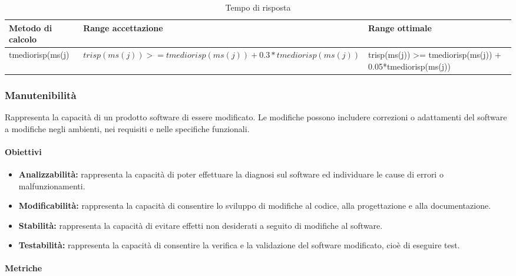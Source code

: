 			\begin{table}[H]
				\begin{longtable}{>{\centering\arraybackslash}p{5cm}|>{\centering\arraybackslash}p{5cm} | >{\centering\arraybackslash}p{5cm}}
					\hline
					\rowcolor{Gray}
					\textbf{Metodo di calcolo} & \textbf{Range accettazione} & \textbf{Range ottimale} \\
					\hline
					tmediorisp(ms(j) &\begin{math}trisp(ms(j)) >= tmediorisp(ms(j)) + 0.3*tmediorisp(ms(j)) \end{math}& trisp(ms(j)) >= tmediorisp(ms(j)) + 0.05*tmediorisp(ms(j))
				\end{longtable}
				\caption{Tempo di risposta}
			\end{table}
						
	
			
	\subsubsection{Manutenibilità}
	Rappresenta la capacità di un prodotto software di essere modificato. Le modifiche possono includere correzioni o adattamenti del software a modifiche negli ambienti, nei requisiti e nelle specifiche funzionali.
	
		\paragraph{Obiettivi}
			\begin{itemize}
				\item \textbf{Analizzabilità:} rappresenta la capacità di poter effettuare la diagnosi sul software ed individuare le cause di errori o malfunzionamenti.
				\item \textbf{Modificabilità:} rappresenta la capacità di consentire lo sviluppo di modifiche al codice, alla progettazione e alla documentazione.
				\item \textbf{Stabilità:} rappresenta la capacità di evitare effetti non desiderati a seguito di modifiche al software.
				\item \textbf{Testabilità:} rappresenta la capacità di consentire la verifica e la validazione del software modificato, cioè di eseguire test.
			\end{itemize}
	
		\paragraph{Metriche}

